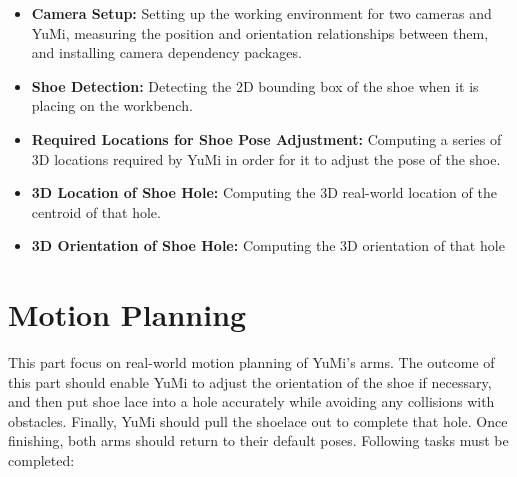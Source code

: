 \begin{itemize}
    \item \textbf{Camera Setup:} Setting up the working environment for two cameras and YuMi, measuring the position and orientation relationships between them, and installing camera dependency packages.
    \item \textbf{Shoe Detection:} Detecting the 2D bounding box of the shoe when it is placing on the workbench.
    \item \textbf{Required Locations for Shoe Pose Adjustment:} Computing a series of 3D locations required by YuMi in order for it to adjust the pose of the shoe.
    \item \textbf{3D Location of Shoe Hole:} Computing the 3D real-world location of the centroid of that hole.
    \item \textbf{3D Orientation of Shoe Hole:} Computing the 3D orientation of that hole
\end{itemize}


\section{Motion Planning}
This part focus on real-world motion planning of YuMi's arms. The outcome of this part should enable YuMi to adjust the orientation of the shoe if necessary, and then put shoe lace into a hole accurately while avoiding any collisions with obstacles. Finally, YuMi should pull the shoelace out to complete that hole. Once finishing, both arms should return to their default poses. Following tasks must be completed:

